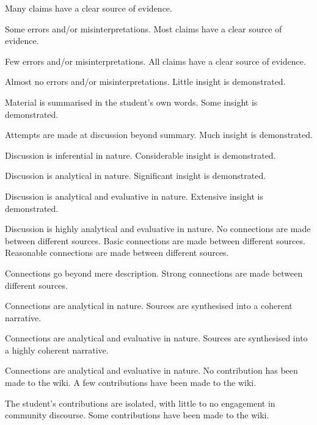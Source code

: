 \documentclass{../../fal_assignment}
\begin{document}
\begin{markingrubric}
        \grade 		Many claims have a clear source of evidence.
        \par 		Some errors and/or misinterpretations.
        \grade 		Most claims have a clear source of evidence.
        \par 		Few errors and/or misinterpretations.
        \grade 		All claims have a clear source of evidence.
        \par 		Almost no errors and/or misinterpretations.
%
        \grade\fail Little insight is demonstrated.
        \par		Material is summarised in the student's own words.
        \grade		Some insight is demonstrated.
        \par		Attempts are made at discussion beyond summary.
        \grade		Much insight is demonstrated.
        \par		Discussion is inferential in nature.
        \grade		Considerable insight is demonstrated.
        \par		Discussion is analytical in nature.
        \grade		Significant insight is demonstrated.
        \par		Discussion is analytical and evaluative in nature.
        \grade		Extensive insight is demonstrated.
        \par		Discussion is highly analytical and evaluative in nature.
%
        \grade\fail No connections are made between different sources.
        \grade		Basic connections are made between different sources.
        \grade		Reasonable connections are made between different sources.
        \par		Connections go beyond mere description.
        \grade		Strong connections are made between different sources.
        \par		Connections are analytical in nature.
        \grade		Sources are synthesised into a coherent narrative.
        \par		Connections are analytical and evaluative in nature.
        \grade		Sources are synthesised into a highly coherent narrative.
        \par		Connections are analytical and evaluative in nature.
%
        \grade\fail 	No contribution has been made to the wiki.
        \grade 		A few contributions have been made to the wiki.
		\par		The student's contributions are isolated, with little to no engagement in community discourse.
        \grade 		Some contributions have been made to the wiki.

\end{markingrubric}
\end{document}
